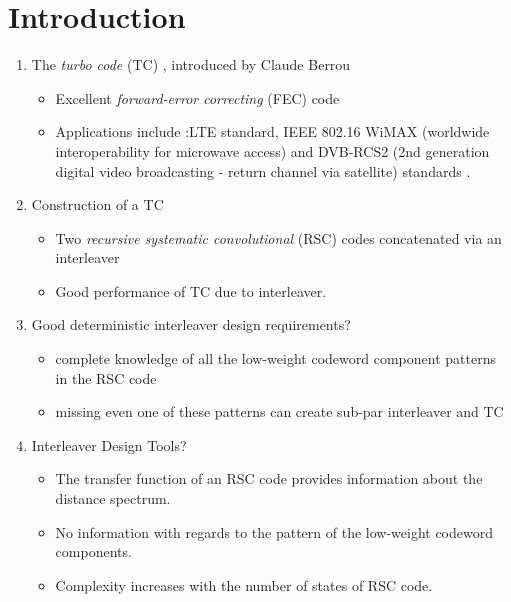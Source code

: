\section{Introduction}

\begin{enumerate}
\item The {\it turbo code} (TC) \cite{ref1}, introduced by Claude Berrou 
\begin{itemize}
\item Excellent  \textit{forward-error correcting} (FEC) code

\item Applications include :LTE standard, IEEE 802.16 WiMAX (worldwide interoperability for microwave access) and DVB-RCS2 (2nd generation digital video broadcasting - return channel via satellite) standards \cite{ref7}.
\end{itemize}


 \item Construction of a TC 
 \begin{itemize}
 \item  Two {\it recursive systematic convolutional} (RSC) codes concatenated via an interleaver
 
 \item Good performance of TC due to interleaver. 
 \end{itemize}


\item Good deterministic interleaver design requirements?
\begin{itemize}
\item complete knowledge of all the low-weight codeword component patterns in the RSC code

\item missing even one of these patterns can create sub-par interleaver and TC

\end{itemize}

\item Interleaver Design Tools?
\begin{itemize}
\item The transfer function of an RSC code provides information about the distance spectrum.

\item No information with regards to the pattern of the low-weight codeword components.

\item Complexity increases with the number of states of RSC code.


\end{itemize}
\end{enumerate}
